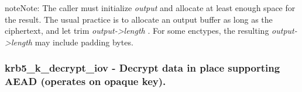 \documentclass[letterpaper,10pt,english]{sphinxmanual}
\begin{document}
\begin{notice}{note}{Note:}
The caller must initialize \emph{output} and allocate at least enough space for the result. The usual practice is to allocate an output buffer as long as the ciphertext, and let {\hyperref[appdev/refs/api/krb5_c_decrypt:krb5_c_decrypt]{}} trim \emph{output-\textgreater{}length} . For some enctypes, the resulting \emph{output-\textgreater{}length} may include padding bytes.
\end{notice}


\subsubsection{krb5\_k\_decrypt\_iov -  Decrypt data in place supporting AEAD (operates on opaque key).}
\label{appdev/refs/api/krb5_k_decrypt_iov::doc}\label{appdev/refs/api/krb5_k_decrypt_iov:krb5-k-decrypt-iov-decrypt-data-in-place-supporting-aead-operates-on-opaque-key}

\begin{fulllineitems}
\label{appdev/refs/api/krb5_k_decrypt_iov:krb5_k_decrypt_iov}
\end{fulllineitems}
\end{document}
